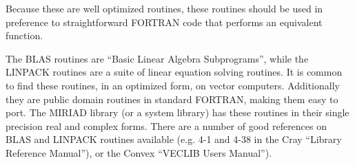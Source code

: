 Because these are well optimized routines, these routines should be used in
preference to straightforward FORTRAN code that performs an equivalent
function.


The BLAS routines are ``Basic Linear Algebra Subprograms'', while the
LINPACK routines are a suite of linear equation solving routines. It is
common to find these routines, in an optimized form, on vector computers.
Additionally they are public domain routines in standard FORTRAN, making them
easy to port. The MIRIAD library (or a system library) has these routines in
their single precision real and complex forms.
There are a number of good references on BLAS and LINPACK routines
available (e.g. 4-1 and 4-38 in the Cray ``Library Reference Manual''),
or the Convex ``VECLIB Users Manual'').
